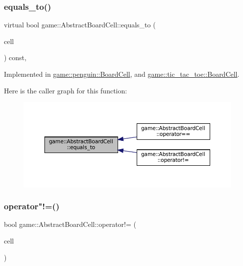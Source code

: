 \subsubsection{\texorpdfstring{equals\+\_\+to()}{equals\_to()}}
{\footnotesize\ttfamily virtual bool game\+::\+Abstract\+Board\+Cell\+::equals\+\_\+to (\begin{DoxyParamCaption}\item[{const \hyperlink{classgame_1_1_abstract_board_cell}{Abstract\+Board\+Cell} \&}]{cell }\end{DoxyParamCaption}) const\hspace{0.3cm}{\ttfamily [protected]}, {}}



Implemented in \hyperlink{classgame_1_1penguin_1_1_board_cell_a1ed5a3134f831bef111c6294c07388bf}{game\+::penguin\+::\+Board\+Cell}, and \hyperlink{classgame_1_1tic__tac__toe_1_1_board_cell_a909bb91d32553cebbe9749bd6814b8f4}{game\+::tic\+\_\+tac\+\_\+toe\+::\+Board\+Cell}.

Here is the caller graph for this function\+:
\nopagebreak
\begin{figure}[H]
\begin{center}
\leavevmode
\includegraphics[width=350pt]{classgame_1_1_abstract_board_cell_a3939330bed75f3a408af228e86ec93af_icgraph}
\end{center}
\end{figure}
\mbox{\label{classgame_1_1_abstract_board_cell_a4a649f51a349dad0246fed9e8faee922}} 
\subsubsection{\texorpdfstring{operator"!=()}{operator!=()}}
{\footnotesize\ttfamily bool game\+::\+Abstract\+Board\+Cell\+::operator!= (\begin{DoxyParamCaption}\item[{const \hyperlink{classgame_1_1_abstract_board_cell}{Abstract\+Board\+Cell} \&}]{cell }\end{DoxyParamCaption})\hspace{0.3cm}{\ttfamily [inline]}}

